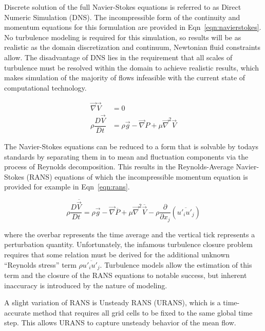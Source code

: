 \documentclass[journal]{new-aiaa}
\begin{document}
 Discrete solution of the full Navier-Stokes equations is referred to as Direct Numeric Simulation (DNS). The incompressible form of the continuity and momentum equations for this formulation are provided in Eqn~\ref{eqn:navierstokes}. No turbulence modeling is required for this simulation, so results will be as realistic as the domain discretization and continuum, Newtonian fluid constraints allow. The disadvantage of DNS lies in the requirement that all scales of turbulence must be resolved within the domain to achieve realistic results, which makes simulation of the majority of flows infeasible with the current state of computational technology.

\begin{equation}
\label{eqn:navierstokes}
\begin{split}
\vec{\nabla}\vec{V} &= 0 \\
\rho \dfrac{D \vec{V}}{D t}
    &= \rho\vec{g} - \vec{\nabla} P + \mu \vec{\nabla}^2 \vec{V}
\end{split}
\end{equation}

The Navier-Stokes equations can be reduced to a form that is solvable by todays standards by separating them in to mean and fluctuation components via the process of Reynolds decomposition. This results in the Reynolds-Average Navier-Stokes (RANS) equations of which the incompressible momentum equation is provided for example in Eqn~\ref{eqn:rans}.



\begin{equation}
\label{eqn:rans}
\rho \dfrac{D \overline{\vec{V}}}{D t}
    = \rho\vec{g} - \vec{\nabla} \overline{P}
    + \mu \vec{\nabla}^2 \overline{\vec{V}}
    - \rho \dfrac{\partial}{\partial x_j} \left( \overline{u'_i u'_j} \right)
\end{equation}

\noindent where the overbar represents the time average and the vertical tick represents a perturbation quantity. Unfortunately, the infamous turbulence closure problem requires that some relation must be derived for the additional unknown ``Reynolds stress'' term $\rho \overline{u'_i u'_j}$. Turbulence models allow the estimation of this term and the closure of the RANS equations to notable success, but inherent inaccuracy is introduced by the nature of modeling.

A slight variation of RANS is Unsteady RANS (URANS), which is a time-accurate method that requires all grid cells to be fixed to the same global time step.  This allows URANS to capture unsteady behavior of the mean flow.
\end{document}
